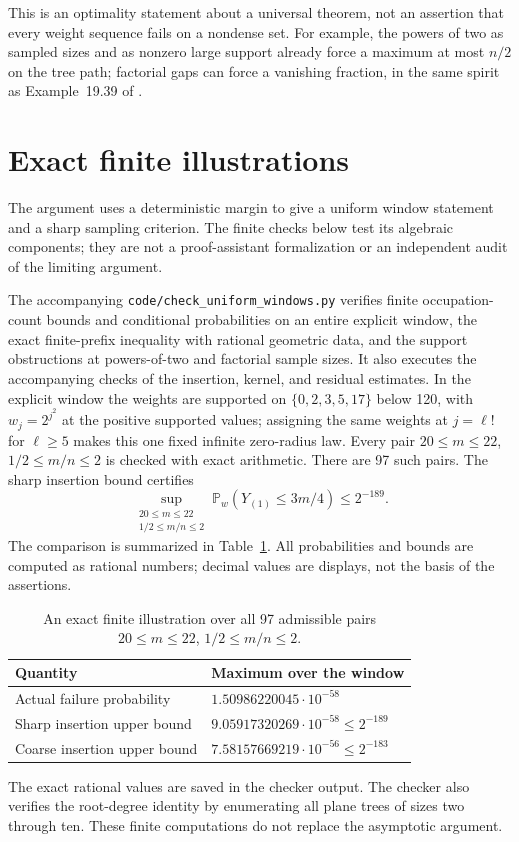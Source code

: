 \documentclass[11pt]{amsart}
\theoremstyle{remark}\newtheorem{remark}[theorem]{Remark}
\newcommand{\Pp}{\mathbb P}
\begin{document}
This is an optimality statement about a universal theorem, not an assertion
that every weight sequence fails on a nondense set. For example, the powers
of two as sampled sizes and as nonzero large support already force a
maximum at most $n/2$ on the tree path; factorial gaps can force a vanishing
fraction, in the same spirit as Example~19.39 of \cite{Janson}.

\section{Exact finite illustrations}\label{sec:finite}
The argument uses a deterministic margin to give a uniform window statement
and a sharp sampling criterion. The finite checks below test its algebraic
components; they are not a proof-assistant formalization or an independent
audit of the limiting argument.

The accompanying \texttt{code/check\_uniform\_windows.py} verifies finite
occupation-count bounds and conditional probabilities on an entire explicit
window, the exact finite-prefix inequality with rational geometric data,
and the support obstructions at powers-of-two and factorial sample sizes.
It also executes the accompanying checks of the insertion, kernel, and
residual estimates. In the explicit window the
weights are supported on $\{0,2,3,5,17\}$ below 120, with
$w_j=2^{j^2}$ at the positive supported values; assigning the same weights
at $j=\ell!$ for $\ell\ge5$ makes this one fixed infinite zero-radius law.
Every pair $20\le m\le22$, $1/2\le m/n\le2$ is checked with exact arithmetic.
There are 97 such pairs. The sharp insertion bound certifies
\[
 \sup_{\substack{20\le m\le22\\1/2\le m/n\le2}}
 \Pp_w(Y_{(1)}\le3m/4)\le2^{-189}.
\]
The comparison is summarized in Table~\ref{tab:finite}. All probabilities
and bounds are computed as rational numbers; decimal values are displays,
not the basis of the assertions.
\begin{table}[ht]
\centering
\caption{An exact finite illustration over all 97 admissible pairs
$20\le m\le22$, $1/2\le m/n\le2$.}\label{tab:finite}
\begin{tabular}{@{}ll@{}}
\toprule
Quantity & Maximum over the window \\
\midrule
Actual failure probability & $1.50986220045\cdot10^{-58}$ \\
Sharp insertion upper bound & $9.05917320269\cdot10^{-58}\le2^{-189}$ \\
Coarse insertion upper bound & $7.58157669219\cdot10^{-56}\le2^{-183}$ \\
\bottomrule
\end{tabular}
\end{table}
The exact rational values are saved in the checker output. The
checker also verifies the root-degree identity by enumerating all plane
trees of sizes two through ten.
These finite computations do not replace the asymptotic argument.
\end{document}
